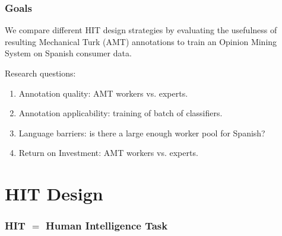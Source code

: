 \documentclass[10pt]{beamer}
\begin{document}
\begin{frame}
  \frametitle{Goals}
We compare different HIT design strategies by evaluating the usefulness of resulting Mechanical Turk (AMT) annotations to train an Opinion Mining System on Spanish consumer data.\\

\vspace{1cm}

\begin{block}{Research questions:}
 \begin{enumerate}
 \item Annotation quality: AMT workers vs. experts.
 \item Annotation applicability: training of batch of classifiers.
 \item Language barriers: is there a large enough worker pool for Spanish?
 \item Return on Investment: AMT workers vs. experts.
\end{enumerate}
\end{block}

\end{frame}

\section{HIT Design}

\begin{frame}
  \frametitle{HIT $=$ Human Intelligence Task}
  \begin{center}
  \end{center}
\end{frame}
\end{document}
